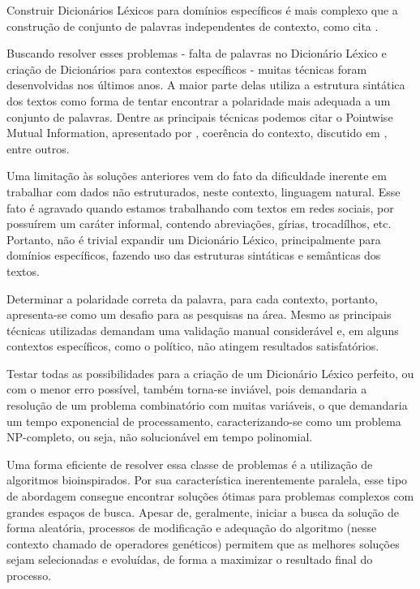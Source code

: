 \documentclass[a4paper,11pt]{article}
\begin{document}
Construir Dicionários Léxicos para domínios específicos é mais complexo que a construção de conjunto de palavras independentes de contexto, como cita \cite{Kanayama2006}.

Buscando resolver esses problemas - falta de palavras no Dicionário Léxico e criação de Dicionários para contextos específicos - muitas técnicas foram desenvolvidas nos últimos anos. A maior parte delas utiliza a estrutura sintática dos textos como forma de tentar encontrar a polaridade mais adequada a um conjunto de palavras. Dentre as principais técnicas podemos citar o Pointwise Mutual Information, apresentado por \cite{Turney2002}, coerência do contexto, discutido em \cite{Kanayama2006}, entre outros.

Uma limitação às soluções anteriores vem do fato da dificuldade inerente em trabalhar com dados não estruturados, neste contexto, linguagem natural. Esse fato é agravado quando estamos trabalhando com textos em redes sociais, por possuírem um caráter informal, contendo abreviações, gírias, trocadílhos, etc. Portanto, não é trivial expandir um Dicionário Léxico, principalmente para domínios específicos, fazendo uso das estruturas sintáticas e semânticas dos textos.

Determinar a polaridade correta da palavra, para cada contexto, portanto, apresenta-se como um desafio para as pesquisas na área. Mesmo as principais técnicas utilizadas demandam uma validação manual considerável e, em alguns contextos específicos, como o político, não atingem resultados satisfatórios.

Testar todas as possibilidades para a criação de um Dicionário Léxico perfeito, ou com o menor erro possível, também torna-se inviável, pois demandaria a resolução de um problema combinatório com muitas variáveis, o que demandaria um tempo exponencial de processamento, caracterizando-se como um problema NP-completo, ou seja, não solucionável em tempo polinomial.

Uma forma eficiente de resolver essa classe de problemas é a utilização de algoritmos bioinspirados. Por sua característica inerentemente paralela, esse tipo de abordagem consegue encontrar soluções ótimas para problemas complexos com grandes espaços de busca. Apesar de, geralmente, iniciar a busca da solução de forma aleatória, processos de modificação e adequação do algoritmo (nesse contexto chamado de operadores genéticos) permitem que as melhores soluções sejam selecionadas e evoluídas, de forma a maximizar o resultado final do processo.
\end{document}
